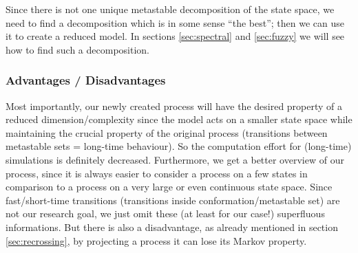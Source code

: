 Since there is not one unique metastable decomposition of the state space, we need to find a decomposition which is in some sense ``the best''; then we can use it to create a reduced model. In sections \ref{sec:spectral} and \ref{sec:fuzzy} we will see how to find such a decomposition.



\subsubsection*{Advantages / Disadvantages} 

Most importantly, our newly created process will have the desired property of a reduced dimension/complexity since the model acts on a smaller state space while maintaining the crucial property of the original process (transitions between metastable sets = long-time behaviour). So the computation effort for (long-time) simulations is definitely decreased.
Furthermore, we get a better overview of our process, since it is always easier to consider a process on a few states in comparison to a process on a very large or even continuous state space. Since fast/short-time transitions (transitions inside conformation/metastable set) are not our research goal, we just omit these (at least for our case!) superfluous informations.
But there is also a disadvantage, as already mentioned in section \ref{sec:recrossing}, by projecting a process it can lose its Markov property.

